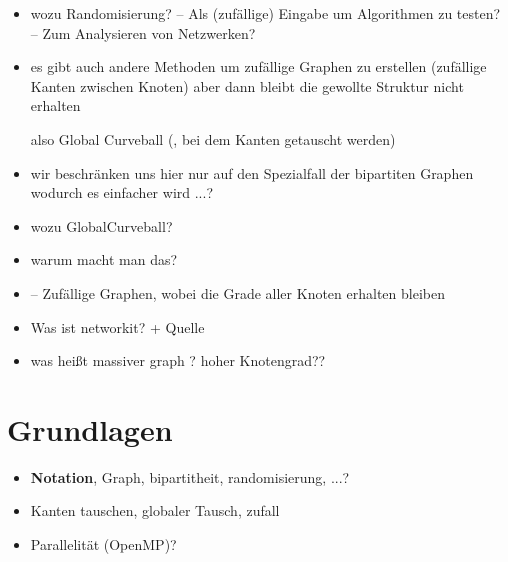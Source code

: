 \documentclass[a4paper]{scrreprt}
\theoremstyle{plain} %
\theoremstyle{definition} %
\begin{document}
\begin{itemize}

\item
wozu Randomisierung?
-- Als (zufällige) Eingabe um Algorithmen zu testen?
-- Zum Analysieren von Netzwerken?


\item
es gibt auch andere Methoden um zufällige Graphen zu erstellen (zufällige Kanten zwischen Knoten)
aber dann bleibt die gewollte Struktur nicht erhalten

also Global Curveball (, bei dem Kanten getauscht werden)


\item
wir beschränken uns hier nur auf den Spezialfall der bipartiten Graphen wodurch es einfacher wird ...?

\item
wozu GlobalCurveball?

\item
warum macht man das?

\item-- Zufällige Graphen, wobei die Grade aller Knoten erhalten bleiben

\item
Was ist networkit? +  Quelle

\item
was heißt massiver graph ? 
hoher Knotengrad??

\end{itemize}


\chapter{Grundlagen}

\begin{itemize}
\item \textbf{Notation}, Graph, bipartitheit, randomisierung, ...? 

\item Kanten tauschen, globaler Tausch, zufall


\item Parallelität (OpenMP)?


\end{itemize}






\end{document}

